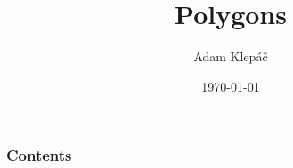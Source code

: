 \documentclass[aspectratio=169,11pt,svgnames,draft]{beamer}
\title{Polygons}
\date{\today}
\author{Adam Klepáč}
\institute[GEVO]{Gymnázium Evolution Jižní Město}
\begin{document}
\titleframe

\begin{frame}
 \frametitle{Contents}
 \tableofcontents
\end{frame}

%
%
%
%
\end{document}
